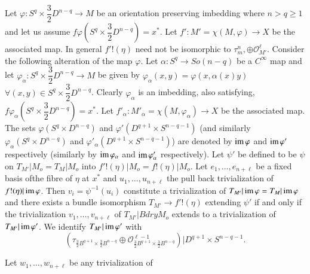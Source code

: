 Let $\varphi: S^q \times \dfrac{3}{2} D^{n-q}\rightarrow M$ be an
orientation preserving imbedding where $n > q \geq 1$ and let us
assume $f \varphi (S^q \times \dfrac{3}{2} D^{n-q}) = x^*$. Let $f': M'
= \chi (M,\varphi) \rightarrow X$ be the associated map. In general
$f' ! (\eta)$ need not be isomorphic to $\tau^n_{m}, \oplus
\mathscr{O}^\ell_{M'}$. Consider the following alteration of the map $\varphi
$. Let $\alpha : S^q \rightarrow So (n-q)$ be a $C^\infty$ map 
and let $\varphi_\alpha: S^q \times \dfrac{3}{2}D^{n-q}\rightarrow M$
be given by $\varphi_\alpha (x,y) = \varphi (x, \alpha (x) y)$ $\forall
(x,y) \in S^q \times \dfrac{3}{2}D^{n-q} $. Clearly
$\varphi_\alpha $ is an imbedding, also satisfying, $f \varphi_\alpha
(S^q \times \dfrac{3}{2}D^{n-q}) = x^*$. Let $f'_\alpha: M'_\alpha =
\chi (M, \varphi_\alpha) \rightarrow X$ be the associated map. The
sets $\varphi (S^q \times D^{n-q})$ and $\varphi' (D^{q+1}\times
S^{n-q-1})$ (and similarly $\varphi_\alpha (S^q \times D^{n-q}) $ and 
$\varphi'_\alpha (D^{q+1}\times S^{n-q-1})$) are denoted by $\operatorname{im}
\varphi$ and $\operatorname{im} \varphi'$ respectively (similarly by $\operatorname{im} 
\varphi_\alpha$ and $\operatorname{im} \varphi'_\alpha$ respectively). Let $\psi'$ be
defined to be $\psi$ on $T_{M'}| M_o = T_M| M_o $ into $f'! (\eta)
|M_o = f!(\eta) |M_o$. Let $e_1, \ldots, e_{n+\ell}$ be a fixed basis
of\pageoriginale the fibre of $\eta$ at $x^*$ and $u_1, \ldots,
u_{n+\ell}$ the pull 
back trivialization of $f! (\eta) | \operatorname{im} \varphi $. Then $v_i =
\psi^{-1}(u_i) $ constitute a trivialization of $T_{M'}|\operatorname{im} \varphi =
T_M |\operatorname{im} \varphi$ and there exists a bundle isomorphism
$T_{M'}\rightarrow f'! (\eta) $ extending $\psi'$ if and only if the
trivialization $v_1, \ldots,  v_{n+\ell}$ of $T_{M'} | Bdry M_o$ extends
to a trivialization of $T_{M'}|\operatorname{im} \varphi'$. We identify $T_{M'}|\operatorname{im}
\varphi'$ with 
$$
 \left( \tau_{\frac{3}{2} B^{q+1} \times \frac{3}{2}B^{n-q}}  \oplus
 \mathscr{O}^{\ell-1}_{ \frac{3}{2} B^{q+1} \times \frac{3}{2}
   B^{n-q}} \right) \bigg| D^{q+1} \times S^{n-q-1}. 
$$

 Let $w_1, \ldots,w_{n+\ell}$ be any trivialization of
 
